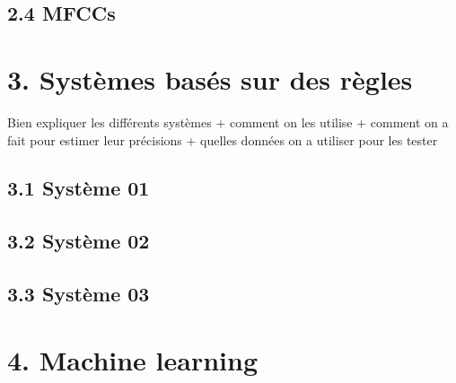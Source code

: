 \documentclass[a4paper,12pt]{report}	%
\begin{document}
{\subsection*{2.4 MFCCs}}
	
{\section*{3. Systèmes basés sur des règles}}
	Bien expliquer les différents systèmes + comment on les utilise + comment on a fait pour estimer leur précisions + quelles données on a utiliser pour les tester

{\subsection*{3.1 Système 01}}

{\subsection*{3.2 Système 02}}

{\subsection*{3.3 Système 03}}

{\section*{4. Machine learning}}
\end{document}
